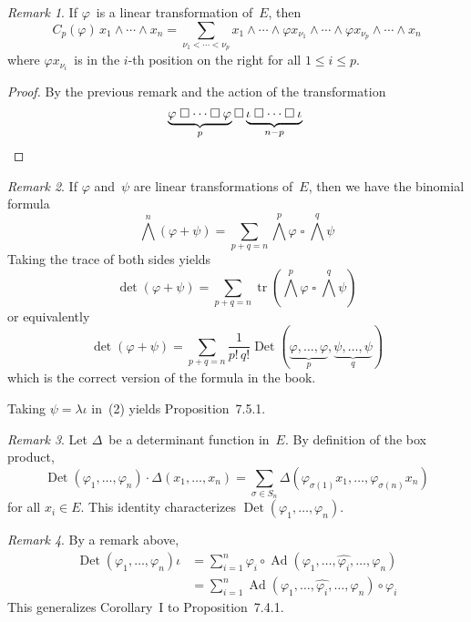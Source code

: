 \documentclass[letterpaper,12pt]{article}
\DeclareMathOperator{\Ad}{Ad}
\DeclareMathOperator{\tr}{tr}
\DeclareMathOperator{\Det}{Det}
\newcommand{\after}{\circ}
\newcommand{\mult}{\cdot}
\newcommand{\eprod}{\wedge}
\newcommand{\bigeprod}{\bigwedge}
\newcommand{\medeprod}{{\textstyle\bigeprod}}
\newcommand{\bprod}{\mathbin{\square}}
\newcommand{\delete}{\widehat}
\newcommand{\multi}[4]{#2_{#3}#1\cdots#1#2_{#4}}
\newcommand{\eprods}[3]{\multi{\eprod}{#1}{#2}{#3}}
\newcommand{\bprods}[3]{\multi{\bprod}{#1}{#2}{#3}}
\theoremstyle{definition}
\theoremstyle{remark}
\newtheorem*{rmk}{Remark}
\begin{document}
\begin{rmk}
If \(\varphi\)~is a linear transformation of~\(E\), then
\[C_p(\varphi)\,\eprods{x}{1}{n}=\sum_{\nu_1<\cdots<\nu_p}x_1\eprod\cdots\eprod\varphi x_{\nu_1}\eprod\cdots\eprod\varphi x_{\nu_p}\eprod\cdots\eprod x_n\]
where \(\varphi x_{\nu_i}\)~is in the \(i\)-th position on the right for all \(1\le i\le p\).
\end{rmk}
\begin{proof}
By the previous remark and the action of the transformation
\[\underbrace{\bprods{\varphi}{}{}}_p\bprod\underbrace{\bprods{\iota}{}{}}_{n-p}\qedhere\]
\end{proof}

\begin{rmk}
If \(\varphi\) and~\(\psi\) are linear transformations of~\(E\), then we have the binomial formula
\[\medeprod^n(\varphi+\psi)=\sum_{p+q=n}\medeprod^p\varphi\bprod\medeprod^q\psi\tag{1}\]
Taking the trace of both sides yields
\[\det(\varphi+\psi)=\sum_{p+q=n}\tr(\medeprod^p\varphi\bprod\medeprod^q\psi)\tag{2}\]
or equivalently
\[\det(\varphi+\psi)=\sum_{p+q=n}\frac{1}{p!\,q!}\Det(\underbrace{\varphi,\ldots,\varphi}_p,\underbrace{\psi,\ldots,\psi}_q)\]
which is the correct version of the formula in the book.

Taking \(\psi=\lambda\iota\) in~(2) yields Proposition~7.5.1.
\end{rmk}

\begin{rmk}
Let \(\Delta\)~be a determinant function in~\(E\). By definition of the box product,
\[\Det(\varphi_1,\ldots,\varphi_n)\mult\Delta(x_1,\ldots,x_n)=\sum_{\sigma\in S_n}\Delta(\varphi_{\sigma(1)}x_1,\ldots,\varphi_{\sigma(n)}x_n)\]
for all \(x_i\in E\). This identity characterizes \(\Det(\varphi_1,\ldots,\varphi_n)\).
\end{rmk}

\begin{rmk}
By a remark above,
\begin{align*}
\Det(\varphi_1,\ldots,\varphi_n)\iota&=\sum_{i=1}^n\varphi_i\after\Ad(\varphi_1,\ldots,\delete{\varphi_i},\ldots,\varphi_n)\\
	&=\sum_{i=1}^n\Ad(\varphi_1,\ldots,\delete{\varphi_i},\ldots,\varphi_n)\after\varphi_i
\end{align*}
This generalizes Corollary~I to Proposition~7.4.1.
\end{rmk}
\end{document}
